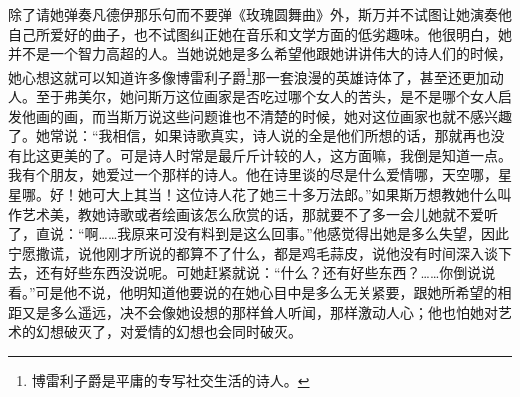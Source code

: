 \par 除了请她弹奏凡德伊那乐句而不要弹《玫瑰圆舞曲》外，斯万并不试图让她演奏他自己所爱好的曲子，也不试图纠正她在音乐和文学方面的低劣趣味。他很明白，她并不是一个智力高超的人。当她说她是多么希望他跟她讲讲伟大的诗人们的时候，她心想这就可以知道许多像博雷利子爵\footnote{博雷利子爵是平庸的专写社交生活的诗人。}那一套浪漫的英雄诗体了，甚至还更加动人。至于弗美尔，她问斯万这位画家是否吃过哪个女人的苦头，是不是哪个女人启发他画的画，而当斯万说这些问题谁也不清楚的时候，她对这位画家也就不感兴趣了。她常说：“我相信，如果诗歌真实，诗人说的全是他们所想的话，那就再也没有比这更美的了。可是诗人时常是最斤斤计较的人，这方面嘛，我倒是知道一点。我有个朋友，她爱过一个那样的诗人。他在诗里谈的尽是什么爱情哪，天空哪，星星哪。好！她可大上其当！这位诗人花了她三十多万法郎。”如果斯万想教她什么叫作艺术美，教她诗歌或者绘画该怎么欣赏的话，那就要不了多一会儿她就不爱听了，直说：“啊……我原来可没有料到是这么回事。”他感觉得出她是多么失望，因此宁愿撒谎，说他刚才所说的都算不了什么，都是鸡毛蒜皮，说他没有时间深入谈下去，还有好些东西没说呢。可她赶紧就说：“什么？还有好些东西？……你倒说说看。”可是他不说，他明知道他要说的在她心目中是多么无关紧要，跟她所希望的相距又是多么遥远，决不会像她设想的那样耸人听闻，那样激动人心；他也怕她对艺术的幻想破灭了，对爱情的幻想也会同时破灭。
